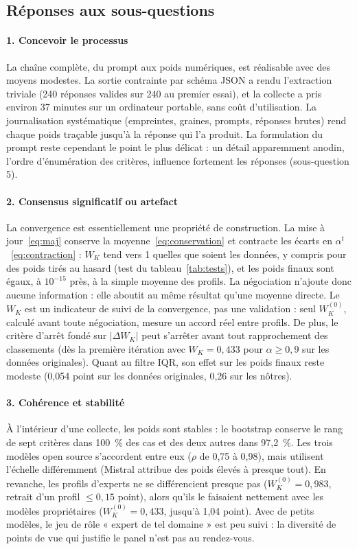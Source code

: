 \documentclass[11pt,a4paper]{article}
\begin{document}
\subsection{Réponses aux sous-questions}

\paragraph{1. Concevoir le processus} La chaîne complète, du prompt aux poids numériques, est réalisable avec des moyens modestes. La sortie contrainte par schéma JSON a rendu l'extraction triviale (240 réponses valides sur 240 au premier essai), et la collecte a pris environ 37 minutes sur un ordinateur portable, sans coût d'utilisation. La journalisation systématique (empreintes, graines, prompts, réponses brutes) rend chaque poids traçable jusqu'à la réponse qui l'a produit. La formulation du prompt reste cependant le point le plus délicat : un détail apparemment anodin, l'ordre d'énumération des critères, influence fortement les réponses (sous-question 5).

\paragraph{2. Consensus significatif ou artefact} La convergence est essentiellement une propriété de construction. La mise à jour~\eqref{eq:maj} conserve la moyenne~\eqref{eq:conservation} et contracte les écarts en $\alpha^t$~\eqref{eq:contraction} : $W_K$ tend vers 1 quelles que soient les données, y compris pour des poids tirés au hasard (test du tableau~\ref{tab:tests}), et les poids finaux sont égaux, à $10^{-15}$ près, à la simple moyenne des profils. La négociation n'ajoute donc aucune information : elle aboutit au même résultat qu'une moyenne directe. Le $W_K$ est un indicateur de suivi de la convergence, pas une validation : seul $W_K^{(0)}$, calculé avant toute négociation, mesure un accord réel entre profils. De plus, le critère d'arrêt fondé sur $|\Delta W_K|$ peut s'arrêter avant tout rapprochement des classements (dès la première itération avec $W_K=0{,}433$ pour $\alpha\ge0{,}9$ sur les données originales). Quant au filtre IQR, son effet sur les poids finaux reste modeste (0,054 point sur les données originales, 0,26 sur les nôtres).

\paragraph{3. Cohérence et stabilité} À l'intérieur d'une collecte, les poids sont stables : le bootstrap conserve le rang de sept critères dans 100~\% des cas et des deux autres dans 97,2~\%. Les trois modèles open source s'accordent entre eux ($\rho$ de 0,75 à 0,98), mais utilisent l'échelle différemment (Mistral attribue des poids élevés à presque tout). En revanche, les profils d'experts ne se différencient presque pas ($W_K^{(0)}=0{,}983$, retrait d'un profil $\le0{,}15$ point), alors qu'ils le faisaient nettement avec les modèles propriétaires ($W_K^{(0)}=0{,}433$, jusqu'à 1,04 point). Avec de petits modèles, le jeu de rôle « expert de tel domaine » est peu suivi : la diversité de points de vue qui justifie le panel n'est pas au rendez-vous.
\end{document}
